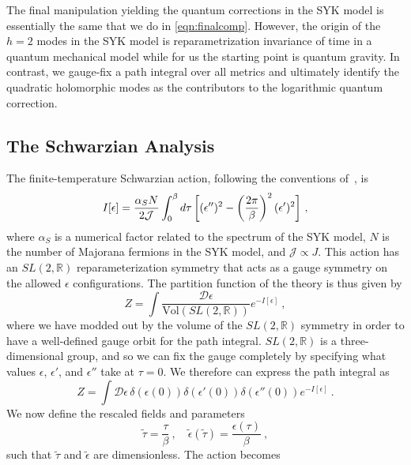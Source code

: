 \documentclass[12pt]{article}
\begin{document}
The final manipulation yielding the quantum corrections in the SYK model is essentially the same that we do in \eqref{eqn:finalcomp}. However, the origin of the $h=2$ modes in the SYK model is reparametrization invariance of time in a quantum mechanical model while for us the starting point is quantum gravity. In contrast, we gauge-fix a path integral over all metrics and ultimately identify the quadratic holomorphic modes as the contributors to the logarithmic quantum correction. 

\subsection{The Schwarzian Analysis}

The finite-temperature Schwarzian action, following the conventions of~\cite{Maldacena:2016hyu}, is
\begin{equation}
	I[\epsilon] = \frac{\alpha_S N}{2 \mathcal{J}} \int_0^{\beta} d\tau\,\bigg{[} (\epsilon'')^2 - \left(\frac{2\pi}{\beta}\right)^2 (\epsilon')^2\bigg{]}~,
\end{equation}
where $\alpha_S$ is a numerical factor related to the spectrum of the SYK model, $N$ is the number of Majorana fermions in the SYK model, and $\mathcal{J} \propto J$.  This action has an $SL(2,\mathbb{R})$ reparameterization symmetry that acts as a gauge symmetry on the allowed $\epsilon$ configurations.  The partition function of the theory is thus given by
\begin{equation}
	Z = \int \frac{\mathcal{D}\epsilon}{\text{Vol}(SL(2,\mathbb{R}))} e^{-I[\epsilon]}~,
\end{equation}
where we have modded out by the volume of the $SL(2,\mathbb{R})$ symmetry in order to have a well-defined gauge orbit for the path integral.  $SL(2,\mathbb{R})$ is a three-dimensional group, and so we can fix the gauge completely by specifying what values $\epsilon$, $\epsilon'$, and $\epsilon''$ take at $\tau = 0$.  We therefore can express the path integral as
\begin{equation}
	Z = \int \mathcal{D}\epsilon\,\delta(\epsilon(0))\delta(\epsilon'(0))\delta(\epsilon''(0)) e^{-I[\epsilon]}~.
\end{equation}
We now define the rescaled fields and parameters
\begin{equation}
	\tilde{\tau} = \frac{\tau}{\beta}~, \quad \tilde{\epsilon}(\tilde{\tau}) = \frac{\epsilon(\tau)}{\beta}~,
\end{equation}
such that $\tilde{\tau}$ and $\tilde{\epsilon}$ are dimensionless.  The action becomes
\end{document}
